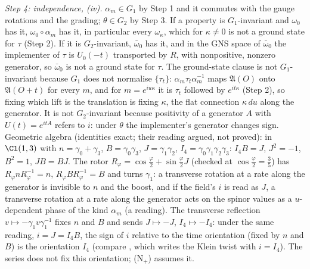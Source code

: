 \emph{Step 4: independence, (iv).} $\alpha_{m} \in G_{1}$ by Step 1 and it commutes with the gauge rotations and the grading; $\theta \in G_{2}$ by Step 3. If a property is $G_{1}$-invariant and $\omega_{0}$ has it, $\omega_{0}\circ\alpha_{m}$ has it, in particular every $\omega_{\kappa}$, which for $\kappa \neq 0$ is not a ground state for $\tau$ (Step 2). If it is $G_{2}$-invariant, $\bar\omega_{0}$ has it, and in the GNS space of $\bar\omega_{0}$ the implementer of $\tau$ is $U_{0}(-t)$ transported by $R$, with nonpositive, nonzero generator, so $\bar\omega_{0}$ is not a ground state for $\tau$. The ground-state clause is not $G_{1}$-invariant because $G_{1}$ does not normalise $\{\tau_{t}\}$: $\alpha_{m}\tau_{t}\alpha_{m}^{-1}$ maps $\mathfrak{A}(O)$ onto $\mathfrak{A}(O + t)$ for every $m$, and for $m = e^{iu\kappa}$ it is $\tau_{t}$ followed by $e^{it\kappa}$ (Step 2), so fixing which lift is the translation is fixing $\kappa$, the flat connection $\kappa\,du$ along the generator. It is not $G_{2}$-invariant because positivity of a generator $A$ with $U(t) = e^{itA}$ refers to $i$: under $\theta$ the implementer's generator changes sign. Geometric algebra (identities exact; their reading argued, not proved): in $\Cl(1,3)$ with $n = \gamma_{0} + \gamma_{3}$, $B = \gamma_{0}\gamma_{3}$, $J = \gamma_{1}\gamma_{2}$, $I_{4} = \gamma_{0}\gamma_{1}\gamma_{2}\gamma_{3}$: $I_{4}B = J$, $J^{2} = -1$, $B^{2} = 1$, $JB = BJ$. The rotor $R_{\varphi} = \cos\tfrac{\varphi}{2} + \sin\tfrac{\varphi}{2}J$ (checked at $\cos\tfrac{\varphi}{2} = \tfrac35$) has $R_{\varphi}nR_{\varphi}^{-1} = n$, $R_{\varphi}BR_{\varphi}^{-1} = B$ and turns $\gamma_{1}$: a transverse rotation at a rate along the generator is invisible to $n$ and the boost, and if the field's $i$ is read as $J$, a transverse rotation at a rate along the generator acts on the spinor values as a $u$-dependent phase of the kind $\alpha_{m}$ (a reading). The transverse reflection $v \mapsto -\gamma_{1}v\gamma_{1}^{-1}$ fixes $n$ and $B$ and sends $J \mapsto -J$, $I_{4} \mapsto -I_{4}$: under the same reading, $i = J = I_{4}B$, the sign of $i$ relative to the time orientation (fixed by $n$ and $B$) is the orientation $I_{4}$ (compare , which writes the Klein twist with $i = I_{4}$). The series does not fix this orientation; (N$_{+}$) assumes it.

